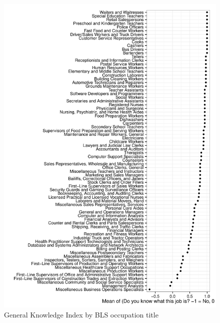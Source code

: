 \documentclass[12pt]{article}
\begin{document}
\begin{figure}
\caption{General Knowledge Index by BLS occupation title \label{fig:knowledge_by_occupation}} 
\centering
\begin{minipage}{0.85 \linewidth}
\includegraphics[width = \linewidth]{./plots/knowledge_by_occupation.pdf}
\end{minipage}  
\end{figure} 
\end{document}
